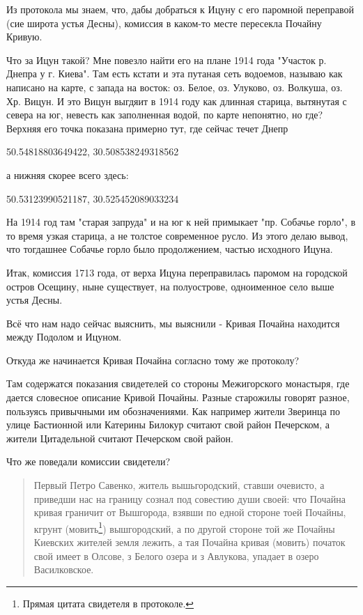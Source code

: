 Из протокола мы знаем, что, дабы добраться к Ицуну с его паромной переправой (сие широта устья Десны), комиссия в каком-то месте пересекла Почайну Кривую.

Что за Ицун такой? Мне повезло найти его на плане 1914 года "Участок р. Днепра у г. Киева". Там есть кстати и эта путаная сеть водоемов, называю как написано на карте, с запада на восток: оз. Белое, оз. Улуково, оз. Волкуша, оз. Хр. Вицун. И это Вицун выгдяит в 1914 году как длинная старица, вытянутая с севера на юг,  невесть как заполненная водой, по карте непонятно, но где? Верхняя его точка показана примерно тут, где сейчас течет Днепр

50.54818803649422, 30.508538249318562

а нижняя скорее всего здесь:

50.53123990521187, 30.525452089033234

На 1914 год там "старая запруда" и на юг к ней примыкает "пр. Собачье горло", в то время узкая старица, а не толстое современное русло. Из этого делаю вывод, что тогдашнее Собачье горло было продолжением, частью исходного Ицуна.

Итак, комиссия 1713 года, от верха Ицуна переправилась паромом на городской остров Осещину, ныне существует, на полуострове,  одноименное село выше устья Десны.

Всё что нам надо сейчас выяснить, мы выяснили - Кривая Почайна находится между Подолом и Ицуном.  

Откуда же начинается Кривая Почайна согласно тому же протоколу?

Там содержатся показания свидетелей со стороны Межигорского монастыря, где дается словесное описание Кривой Почайны. Разные старожилы говорят разное, пользуясь привычными им обозначениями. Как например жители Зверинца по улице Бастионной или Катерины Билокур считают свой район Печерском, а жители Цитадельной считают Печерском свой район.

Что же поведали комиссии свидетели?

\begin{quotation}
Первый Петро Савенко, житель вышьгородский, ставши очевисто, а приведши нас на границу сознал под совестию души своей: что Почайна кривая граничит от Вышгорода, взявши по едной стороне тоей Почайны, кгрунт (мовить\footnote{Прямая цитата свидетеля в протоколе.}) вышгородский, а по другой стороне той же Почайны Киевских жителей земля лежить, а тая Почайна кривая (мовить) початок свой имеет в Олсове, з Белого озера и з Авлукова, упадает в озеро Василковское.
\end{quotation}
 
